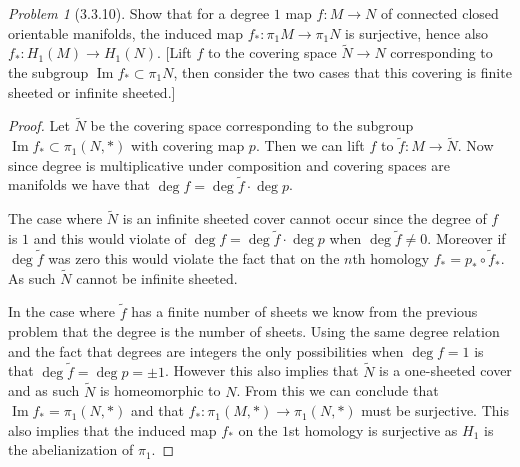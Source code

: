 \documentclass[10pt]{article}
\newcommand{\sk}{\vskip 10mm}
\newcommand{\wt}[1]{\widetilde{#1}}
\DeclareMathOperator{\img}{Im}
\theoremstyle{remark}
\newtheorem{problem}{Problem}
\begin{document}
\sk

\begin{problem}[3.3.10]
  Show that for a degree $1$ map $f:M\rightarrow N$ of connected closed
  orientable manifolds, the induced map $f_*:\pi_1 M\rightarrow \pi_1 N$ is
  surjective, hence also $f_*:H_1(M)\rightarrow H_1(N)$. [Lift $f$ to the
  covering space $\wt{N}\rightarrow N$ corresponding to the subgroup
  $\img f_*\subset\pi_1 N$, then consider the two cases that this covering is
  finite sheeted or infinite sheeted.]
\end{problem}

\begin{proof}
  Let $\wt{N}$ be the covering space corresponding to the subgroup
  $\img f_* \subset\pi_1(N,*)$ with covering map $p$. Then we can lift $f$
  to $\wt{f}:M\rightarrow\wt{N}$. Now since degree is multiplicative under composition
  and covering spaces are manifolds we have that $\deg f=\deg \wt{f}\cdot \deg p$.

  The case where $\wt{N}$ is an infinite sheeted cover cannot occur since
  the degree of $f$ is $1$ and this would violate of $\deg f=\deg\wt{f}\cdot\deg p$
  when $\deg\wt{f}\neq 0$. Moreover if $\deg \wt{f}$ was zero this would violate
  the fact that on the $n$th homology $f_*=p_*\circ \wt{f}_*$. As such $\wt{N}$
  cannot be infinite sheeted.
  
  In the case where $\wt{f}$ has a finite number of sheets we know from the previous
  problem that the degree is the number of sheets. Using the same degree relation
  and the fact that degrees are integers the only possibilities when $\deg f=1$
  is that $\deg\wt{f}=\deg p=\pm 1$. However this also implies that $\wt{N}$ is
  a one-sheeted cover and as such $\wt{N}$ is homeomorphic to $N$. From this we
  can conclude that $\img f_*=\pi_1(N,*)$ and that $f_*:\pi_1(M,*)\rightarrow\pi_1(N,*)$ must be
  surjective. This also implies that the induced map $f_*$ on the $1$st homology
  is surjective as $H_1$ is the abelianization of $\pi_1$.
\end{proof}
\end{document}
